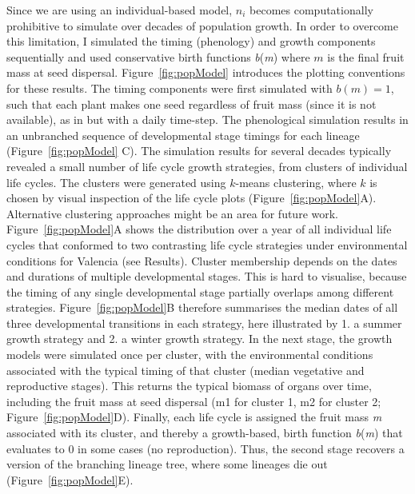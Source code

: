 Since we are using an individual-based model, \(n_{i}\) becomes computationally
prohibitive to simulate over decades of population growth. In order to overcome
this limitation, I simulated the timing (phenology) and growth components
sequentially and used conservative birth functions \emph{b}(\emph{m}) where $m$
is the final fruit mass at seed dispersal. Figure~\ref{fig:popModel} introduces
the plotting conventions for these results. The timing components were first
simulated with \(b(m) = 1\), such that each plant makes one seed regardless of
fruit mass (since it is not available), as in \citet{burghardt_modeling_2015}
but with a daily time-step. The phenological simulation results in an unbranched
sequence of developmental stage timings for each lineage
(Figure~\ref{fig:popModel} C). The simulation results for several decades
typically revealed a small number of life cycle growth strategies, from clusters
of individual life cycles. The clusters were generated using \(k\)-means
clustering, where \(k\) is chosen by visual inspection of the life cycle plots
(Figure~\ref{fig:popModel}A). Alternative clustering approaches might be an area
for future work. Figure~\ref{fig:popModel}A shows the distribution over a year
of all individual life cycles that conformed to two contrasting life cycle
strategies under environmental conditions for Valencia (see Results).  Cluster
membership depends on the dates and durations of multiple developmental
stages. This is hard to visualise, because the timing of any single
developmental stage partially overlaps among different
strategies. Figure~\ref{fig:popModel}B therefore summarises the median dates of
all three developmental transitions in each strategy, here illustrated by 1. a
summer growth strategy and 2. a winter growth strategy. In the next stage, the
growth models were simulated once per cluster, with the environmental conditions
associated with the typical timing of that cluster (median vegetative and
reproductive stages). This returns the typical biomass of organs over time,
including the fruit mass at seed dispersal (m1 for cluster 1, m2 for cluster 2;
Figure~\ref{fig:popModel}D). Finally, each life cycle is assigned the fruit mass
\emph{m} associated with its cluster, and thereby a growth-based, birth
function \emph{b}(\emph{m}) that evaluates to 0 in some cases (no
reproduction). Thus, the second stage recovers a version of the branching
lineage tree, where some lineages die out (Figure~\ref{fig:popModel}E).

